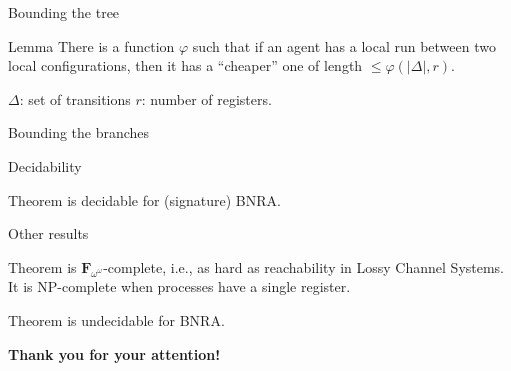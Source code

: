 \documentclass{beamer}
\begin{document}
\begin{frame}{Bounding the tree}
	
	\begin{block}{Lemma}
		There is a function $\varphi$ such that if an agent has a local run between two local configurations, then it has a ``cheaper'' one of length $\leq \varphi(|\Delta|,r)$. 
	\end{block}
	
	$\Delta$: set of transitions \hspace{1cm} $r$: number of registers.
	
\end{frame}

\begin{frame}{Bounding the branches}
	
	

\end{frame}


\begin{frame}{Decidability}
	
	
%	
%	
	
	\begin{block}{Theorem}
		{} is decidable for (signature) BNRA.
	\end{block}


\end{frame}


\begin{frame}{Other results}

	\begin{block}{Theorem}
	{} is $\mathbf{F}_{\omega^\omega}$-complete, i.e., as hard as reachability in Lossy Channel Systems.\\
	It is NP-complete when processes have a single register.
\end{block}



	\begin{block}{Theorem}
			{} is undecidable for BNRA.
	\end{block}



\centering
\Large \textbf{Thank you for your attention!}
	
%	

\end{frame}
	
%
%
%	
%	
%	
\end{document}

